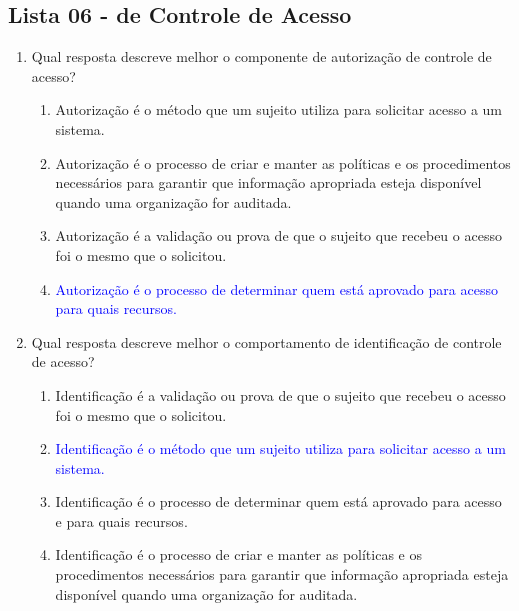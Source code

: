 \documentclass{report}
\begin{document}
	
	
	
	\subsection{Lista 06 - de Controle de Acesso}
	
	\begin{enumerate}
		\item Qual resposta descreve melhor o componente de autorização de controle de acesso?
		\begin{enumerate}[label=(\alph*)]
			\item Autorização é o método que um sujeito utiliza para solicitar acesso a um sistema.
			\item Autorização é o processo de criar e manter as políticas e os procedimentos necessários para garantir que informação apropriada esteja disponível quando uma organização for auditada.
			\item Autorização é a validação ou prova de que o sujeito que recebeu o acesso foi o mesmo que o solicitou.
			\item \textcolor{blue}{Autorização é o processo de determinar quem está aprovado para acesso para quais recursos.}
		\end{enumerate}
		
		\item Qual resposta descreve melhor o comportamento de identificação de controle de acesso?
		\begin{enumerate}[label=(\alph*)]
			\item Identificação é a validação ou prova de que o sujeito que recebeu o acesso foi o mesmo que o solicitou.
			\item \textcolor{blue}{Identificação é o método que um sujeito utiliza para solicitar acesso a um sistema.}
			\item Identificação é o processo de determinar quem está aprovado para acesso e para quais recursos.
			\item Identificação é o processo de criar e manter as políticas e os procedimentos necessários para garantir que informação apropriada esteja disponível quando uma organização for auditada.
		\end{enumerate}
		

\end{enumerate}
\end{document}
